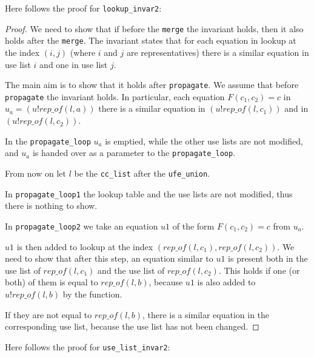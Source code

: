 Here follows the proof for \lstinline{lookup_invar2}:

\begin{proof}
We need to show that if before the \lstinline{merge} the invariant holds, then it also holds after the \lstinline{merge}. The invariant states that for each equation in lookup at the index $(i, j)$ (where $i$ and $j$ are representatives) there is a similar equation in use list $i$ and one in use list $j$.

The main aim is to show that it holds after \lstinline{propagate}. We assume that before \lstinline{propagate} the invariant holds. In particular, each equation $F(c_1, c_2) = c$ in $u_a = (u ! rep\_of(l, a))$ there is a similar equation in $(u ! rep\_of(l, c_1))$ and in $(u ! rep\_of(l, c_2))$.

In the \lstinline{propagate_loop} $u_a$ is emptied, while the other use lists are not modified, and $u_a$ is handed over as a parameter to the \lstinline{propagate_loop}.

From now on let $l$ be the \lstinline{cc_list} after the \lstinline{ufe_union}.

In \lstinline{propagate_loop1} the lookup table and the use lists are not modified, thus there is nothing to show.

In \lstinline{propagate_loop2} we take an equation $u1$ of the form $F(c_1, c_2) = c$ from $u_a$.

$u1$ is then added to lookup at the index $(rep\_of(l, c_1), rep\_of(l, c_2))$. We need to show that after this step, an equation similar to $u1$ is present both in the use list of $rep\_of(l, c_1)$ and the use list of $rep\_of(l, c_2)$.
This holds if one (or both) of them is equal to $rep\_of(l, b)$, because $u1$ is also added to $u ! rep\_of(l, b)$ by the function.

If they are not  equal to $rep\_of(l, b)$, there is a similar equation in the corresponding use list, because the use list has not been changed.
\end{proof}

Here follows the proof for \lstinline{use_list_invar2}:

